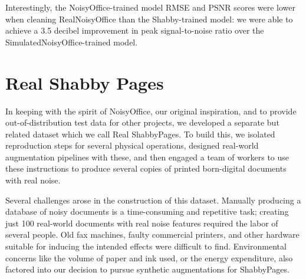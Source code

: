 \documentclass[runningheads]{llncs}
\begin{document}
Interestingly, the NoisyOffice-trained model RMSE and PSNR scores were lower when cleaning RealNoisyOffice than the Shabby-trained model: we were able to achieve a 3.5 decibel improvement in peak signal-to-noise ratio over the SimulatedNoisyOffice-trained model.

\section{Real Shabby Pages}
In keeping with the spirit of NoisyOffice, our original inspiration, and to provide out-of-distribution test data for other projects, we developed a separate but related dataset which we call Real ShabbyPages. To build this, we isolated reproduction steps for several physical operations, designed real-world augmentation pipelines with these, and then engaged a team of workers to use these instructions to produce several copies of printed born-digital documents with real noise.

Several challenges arose in the construction of this dataset.
Manually producing a database of noisy documents is a time-consuming and repetitive task; creating just 100 real-world documents with real noise features required the labor of several people.
Old fax machines, faulty commercial printers, and other hardware suitable for inducing the intended effects were difficult to find. Environmental concerns like the volume of paper and ink used, or the energy expenditure, also factored into our decision to pursue synthetic augmentations for ShabbyPages.



\end{document}

